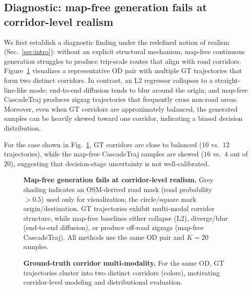 \label{sec:results}

\subsection{Diagnostic: map-free generation fails at corridor-level realism}
\label{sec:results-diagnostic}

We first establish a diagnostic finding under the redefined notion of realism (Sec.~\ref{sec:intro}): without an explicit structural mechanism, map-free continuous generation struggles to produce trip-scale routes that align with road corridors.
Figure~\ref{fig:diagnosis-mapfree} visualizes a representative OD pair with multiple GT trajectories that form two distinct corridors. In contrast, an L2 regressor collapses to a straight-line-like mode; end-to-end diffusion tends to blur around the origin; and map-free CascadeTraj produces zigzag trajectories that frequently cross non-road areas.
Moreover, even when GT corridors are approximately balanced, the generated samples can be heavily skewed toward one corridor, indicating a biased decision distribution.

For the case shown in Fig.~\ref{fig:diagnosis-mapfree}, GT corridors are close to balanced ($10$ vs.\ $12$ trajectories), while the map-free CascadeTraj samples are skewed ($16$ vs.\ $4$ out of $20$), suggesting that decision-stage uncertainty is not well-calibrated.

\begin{figure}[t]
  \centering
  \caption{\textbf{Map-free generation fails at corridor-level realism.}
  Grey shading indicates an OSM-derived road mask (road probability $>0.5$) used only for visualization; the circle/square mark origin/destination. GT trajectories exhibit multi-modal corridor structure, while map-free baselines either collapse (L2), diverge/blur (end-to-end diffusion), or produce off-road zigzags (map-free CascadeTraj). All methods use the same OD pair and $K{=}20$ samples.}
  \label{fig:diagnosis-mapfree}
\end{figure}

\begin{figure}[t]
  \centering
  \caption{\textbf{Ground-truth corridor multi-modality.}
  For the same OD, GT trajectories cluster into two distinct corridors (colors), motivating corridor-level modeling and distributional evaluation.}
  \label{fig:gt-corridors}
\end{figure}


